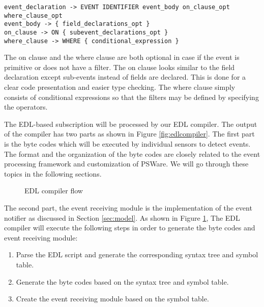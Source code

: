 \begin{lstlisting}[caption=BNF (simplified) of event type, label=lst:BNFEvent]
event_declaration -> EVENT IDENTIFIER event_body on_clause_opt where_clause_opt
event_body -> { field_declarations_opt }
on_clause -> ON { subevent_declarations_opt }
where_clause -> WHERE { conditional_expression }
\end{lstlisting}

The on clause and the where clause are both optional in case if the event is primitive or does not have a filter. The on clause looks similar to the field declaration except sub-events instead of fields are declared. This is done for a clear code presentation and easier type checking. The where clause simply consists of conditional expressions so that the filters may be defined by specifying the operators.

\begin{comment}
A simple example of using EDL is shown in Listing \ref{lst:originaledl}. In this example, two events, 'SimpleEvent' and 'CompEvent' are defined. 'SimpleEvent' is a primitive event which occurs when the detected temperature reading is above certain threshold. 'CompEvent' is a composite event that is based on two events of 'SimpleEvent' and their time must satisfy a certain condition in order to indicate the occurrence of 'CompEvent'.
\begin{lstlisting}[caption=A simple EDL program, label=lst:originaledl]
Event SimpleEvent {
	int temp=System.temp;
	int id=System.id;
	int time=System.time;
} where {
	temp > 30
}
Event CompEvent {
} on {
	SimpleEvent e1 and
	SimpleEvent e2
} where {
	e2.time-e1.time=600
}
\end{lstlisting}
\end{comment}

The EDL-based subscription will be processed by our EDL compiler. The output of the compiler has two parts as shown in Figure \ref{fig:edlcompiler}. The first part is the byte codes which will be executed by individual sensors to detect events. The format and the organization of the byte codes are closely related to the event processing framework and customization of PSWare. We will go through these topics in the following sections.

\begin{figure}
\centering
{}
\caption{EDL compiler flow}
\label{fig:edlcompiler-flow}
\end{figure}

The second part, the event receiving module is the implementation of the event notifier as discussed in Section \ref{sec:model}. As shown in Figure \ref{fig:edlcompiler-flow}, The EDL compiler will execute the following steps in order to generate the byte codes and event receiving module:
\begin{enumerate}
\item Parse the EDL script and generate the corresponding syntax tree and symbol table.
\item Generate the byte codes based on the syntax tree and symbol table.
\item Create the event receiving module based on the symbol table.
\end{enumerate}

